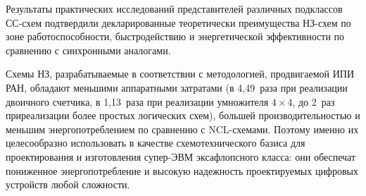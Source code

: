 \begin{multicols}{2}
       Результаты практических исследований представителей различных подклассов 
СС-схем подтвердили декларированные теоретически пре\-иму\-щества НЗ-схем 
по зоне ра\-бо\-то\-спо\-соб\-ности, быстродейст\-вию и энергетической эффективности по сравнению 
с синхронными аналогами.
       
       Схемы НЗ, разрабатываемые в соответствии с методологией, продвигаемой ИПИ 
РАН, обладают меньшими аппаратными затратами (в 4,49~раза при реализации двоичного 
счетчика, в 1,13~раза при реализации умножителя $4\times 4$, до 2~раз при\linebreak реализации 
более простых логических схем), большей производительностью и меньшим 
энергопотреблением по сравнению с NCL-схе\-ма\-ми. Поэтому именно их целесообразно 
использовать в \mbox{качестве} схемотехнического базиса для проектирования и изготовления 
       су\-пер-ЭВМ эксафлопсного класса: они обеспечат пониженное энергопотребление и 
высокую надежность проектируемых циф\-ро\-вых устройств любой сложности.


\end{multicols}

